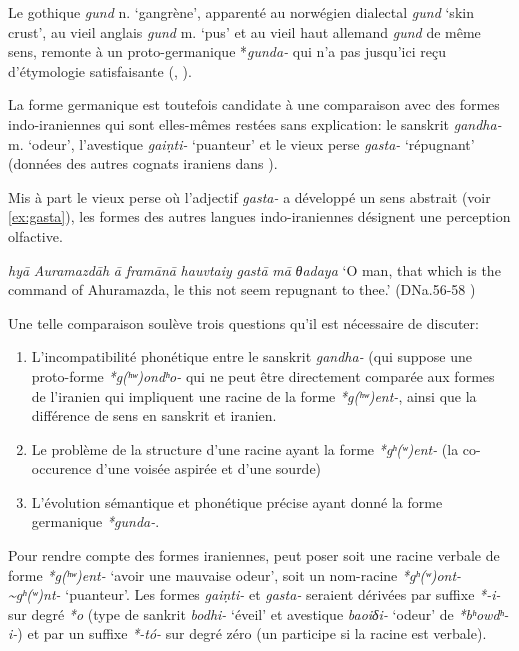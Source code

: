 \documentclass[11pt]{article}
\newcommand{\ipa}[1]{{\phon\textit{#1}}}
\begin{document}
Le gothique \ipa{gund} n. `gangrène', apparenté au norwégien dialectal \ipa{gund} `skin crust', au vieil anglais \ipa{gund} m. `pus' et au vieil haut allemand \ipa{gund} de même sens, remonte à un proto-germanique *\ipa{gunda-} qui n'a pas jusqu'ici reçu d'étymologie satisfaisante (\citealt[195]{kroonen13dict}, \citealt[163, G116]{lehmann86gothic}).

La forme germanique est toutefois candidate à une comparaison avec des formes indo-iraniennes qui sont elles-mêmes restées sans explication: le sanskrit \ipa{gandha-} m. `odeur', l'avestique \ipa{gaiṇti-} `puanteur' et le vieux perse \ipa{gasta-} `répugnant' (données des autres cognats iraniens dans \citealt[103-104]{cheung07dictionary}). 

Mis à part le vieux perse où l'adjectif \ipa{gasta-} a développé un sens abstrait (voir \ref{ex:gasta}), les formes des autres langues indo-iraniennes désignent une perception olfactive. 

\begin{exe}
\ex \label{ex:gasta}
\glt \ipa{martiyā} \ipa{hyā} \ipa{Auramazdāh} \ipa{ā} \ipa{framānā} \ipa{hauvtaiy} \ipa{gastā} \ipa{mā} \ipa{θadaya}
\glt `O man, that which is the command of Ahuramazda, le this not seem repugnant to thee.' (DNa.56-58 \citealt[137]{kent53op})
\end{exe}

Une telle comparaison soulève trois questions qu'il est nécessaire de discuter: 

\begin{enumerate}
\item L'incompatibilité phonétique entre le sanskrit \ipa{gandha-} (qui suppose une proto-forme \ipa{*g(ʰʷ)ondʰo-} qui ne peut être directement comparée aux formes de l'iranien qui impliquent une racine de la forme \ipa{*g(ʰʷ)ent-}, ainsi que la différence de sens en sanskrit et iranien.
\item Le problème de la structure d'une  racine ayant la forme \ipa{*gʰ(ʷ)ent-} (la co-occurence d'une voisée aspirée et d'une sourde)
\item L'évolution sémantique et phonétique précise ayant donné la forme germanique \ipa{*gunda-}.
\end{enumerate}

Pour rendre compte des formes iraniennes, peut poser soit une racine verbale de forme \ipa{*g(ʰʷ)ent-} `avoir une mauvaise odeur', soit un nom-racine  \ipa{*gʰ(ʷ)ont- \textasciitilde *gʰ(ʷ)nt-} `puanteur'. Les formes \ipa{gaiṇti-} et  \ipa{gasta-} seraient dérivées par suffixe \ipa{*-i-} sur degré \ipa{*o} (type de sankrit \ipa{bodhi-} `éveil' et avestique \ipa{baoiδi-} `odeur' de \ipa{*bʰowdʰ-i-}) et par un suffixe \ipa{*-tó-} sur degré zéro (un participe si la racine est verbale).
\end{document}
